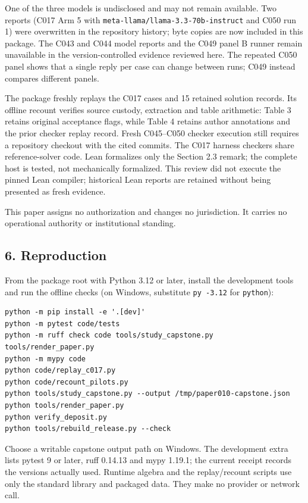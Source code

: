 \documentclass[
  11pt,
]{article}
\begin{document}
One of the three models is undisclosed and may not remain available. Two
reports (C017 Arm 5 with
\texttt{meta-\allowbreak{}llama/\allowbreak{}llama-\allowbreak{}3.3-\allowbreak{}70b-\allowbreak{}instruct}
and C050 run 1) were overwritten in the repository history; byte copies
are now included in this package. The C043 and C044 model reports and
the C049 panel B runner remain unavailable in the version-controlled
evidence reviewed here. The repeated C050 panel shows that a single
reply per case can change between runs; C049 instead compares different
panels.

The package freshly replays the C017 cases and 15 retained solution
records. Its offline recount verifies source custody, extraction and
table arithmetic: Table 3 retains original acceptance flags, while Table
4 retains author annotations and the prior checker replay record. Fresh
C045--C050 checker execution still requires a repository checkout with
the cited commits. The C017 harness checkers share reference-solver
code. Lean formalizes only the Section 2.3 remark; the complete host is
tested, not mechanically formalized. This review did not execute the
pinned Lean compiler; historical Lean reports are retained without being
presented as fresh evidence.

This paper assigns no authorization and changes no jurisdiction. It
carries no operational authority or institutional standing.

\hypertarget{reproduction}{%
\subsection{6. Reproduction}\label{reproduction}}

From the package root with Python 3.12 or later, install the development
tools and run the offline checks (on Windows, substitute
\texttt{py -\allowbreak{}3.12} for \texttt{python}):

\begin{lstlisting}
python -m pip install -e '.[dev]'
python -m pytest code/tests
python -m ruff check code tools/study_capstone.py tools/render_paper.py
python -m mypy code
python code/replay_c017.py
python code/recount_pilots.py
python tools/study_capstone.py --output /tmp/paper010-capstone.json
python tools/render_paper.py
python verify_deposit.py
python tools/rebuild_release.py --check
\end{lstlisting}

Choose a writable capstone output path on Windows. The development extra
lists pytest 9 or later, ruff 0.14.13 and mypy 1.19.1; the current
receipt records the versions actually used. Runtime algebra and the
replay/recount scripts use only the standard library and packaged data.
They make no provider or network call.
\end{document}
